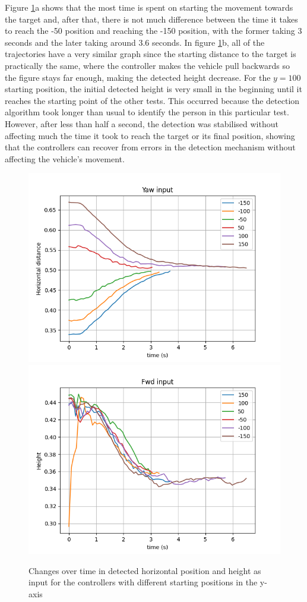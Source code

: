 Figure \ref{fig:validate-yaw}a shows that the most time is spent on starting the movement towards the target and, after that, there is not much difference between the time it takes to reach the -50 position and reaching the -150 position, with the former taking 3 seconds and the later taking around 3.6 seconds.
In figure \ref{fig:validate-yaw}b, all of the trajectories have a very similar graph since the starting distance to the target is practically the same, where the controller makes the vehicle pull backwards so the figure stays far enough, making the detected height decrease.
For the $y=100$ starting position, the initial detected height is very small in the beginning until it reaches the starting point of the other tests.
This occurred because the detection algorithm took longer than usual to identify the person in this particular test.
However, after less than half a second, the detection was stabilised without affecting much the time it took to reach the target or its final position, showing that the controllers can recover from errors in the detection mechanism without affecting the vehicle's movement.


\begin{figure}
  \centering
  \includegraphics[width=.45\linewidth]{img/pid/validation_yaw.png}
  \includegraphics[width=.45\linewidth]{img/pid/validation_yaw_2.png}
  \caption{Changes over time in detected horizontal position and height as input for the controllers with different starting positions in the y-axis}
  \label{fig:validate-yaw}
\end{figure}

